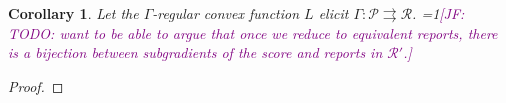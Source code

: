 \documentclass[12pt]{article}
\newcommand{\Comments}{1}
\newcommand{\mynote}[2]{\ifnum\Comments=1\textcolor{#1}{#2}\fi}
\newcommand{\jessie}[1]{\mynote{purple}{[JF: #1]}}
\newcommand{\D}{\mathcal{D}}
\renewcommand{\P}{\mathcal{P}}
\newcommand{\R}{\mathcal{R}}
\newcommand{\toto}{\rightrightarrows}
\newtheorem{corollary}{Corollary}
\begin{document}
\begin{corollary}
	Let the $\Gamma$-regular convex function $L$ elicit $\Gamma:\P \toto \R$.
	\jessie{TODO: want to be able to argue that once we reduce to equivalent reports, there is a bijection between subgradients of the score and reports in $\R'$.}
\end{corollary}
\begin{proof}
\end{proof}
\end{document}
